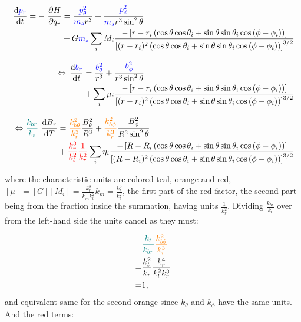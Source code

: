 \begin{align}
    \begin{split}
        \operatorname{}\frac{\mathrm{d} \textcolor{blue}{p_r}}{\mathrm{d} t} = -\operatorname{}\frac{\partial H}{\partial q_r} &= \frac{\textcolor{blue}{p_\theta^2}}{\textcolor{blue}{m_s} r^3} + \frac{\textcolor{blue}{p_\phi^2}}{\textcolor{blue}{m_s} r^3 \sin^2{\theta} } \\
        &+ G \textcolor{blue}{m_s} \sum\limits_{i} M_i \frac{-\left[r - r_i \left(\cos{\theta}\cos{\theta_i} + \sin{\theta}\sin{\theta_i}\cos{(\phi - \phi_i)}\right) \right]}{\left[(r - r_i)^2 \left(\cos{\theta}\cos{\theta_i} + \sin{\theta}\sin{\theta_i}\cos{(\phi - \phi_i)} \right) \right]^{3/2}}
    \end{split} \\[0.3cm]
    \begin{split}
        \Leftrightarrow \operatorname{}\frac{\mathrm{d} \textcolor{blue}{b_r}}{\mathrm{d} t} &= \frac{\textcolor{blue}{b_\theta^2}}{r^3} + \frac{\textcolor{blue}{b_\phi^2}}{r^3 \sin^2{\theta} } \\
        &+ \sum\limits_{i} \mu_i \frac{-\left[r - r_i \left(\cos{\theta}\cos{\theta_i} + \sin{\theta}\sin{\theta_i}\cos{(\phi - \phi_i)}\right) \right]}{\left[(r - r_i)^2 \left(\cos{\theta}\cos{\theta_i} + \sin{\theta}\sin{\theta_i}\cos{(\phi - \phi_i)} \right) \right]^{3/2}}
    \end{split} \\[0.3cm]
    \begin{split}
        \Leftrightarrow \textcolor{teal}{\frac{k_{br}}{k_t}} \operatorname{}\frac{\mathrm{d} B_r}{\mathrm{d} T} &= \textcolor{orange}{\frac{k_{b\theta}^2}{k_r^3}} \frac{B_\theta^2}{R^3} + \textcolor{orange}{\frac{k_{b\phi}^2}{k_r^3}} \frac{B_\phi^2}{R^3 \sin^2{\theta} } \\
        &+ \textcolor{red}{\frac{k_r^3}{k_t^2}\frac{1}{k_r^2}} \sum\limits_{i} \eta_i \frac{-\left[R - R_i \left(\cos{\theta}\cos{\theta_i} + \sin{\theta}\sin{\theta_i}\cos{(\phi - \phi_i)}\right) \right]}{\left[(R - R_i)^2 \left(\cos{\theta}\cos{\theta_i} + \sin{\theta}\sin{\theta_i}\cos{(\phi - \phi_i)} \right) \right]^{3/2}}
    \end{split}
\end{align}

where the characteristic units are colored teal, orange and red, \([\mu] = [G] [M_i] = \frac{k_r^3}{k_m k_t^2} k_m = \frac{k_r^3}{k_t^2} \), the first part of the red factor, the second part being from the fraction inside the summation, having units \(\frac{1}{k_r^2}\). Dividing \(\frac{k_{br}}{k_t}\) over from the left-hand side the units cancel as they must:

\begin{align}
    & \textcolor{teal}{\frac{k_t}{k_{br}}} \textcolor{orange}{\frac{k_{b\theta}^2}{k_r^3} } \\
    = &\frac{k_t^2}{k_r} \frac{k_r^4}{k_t^2 k_r^3}\\
    = &1,
\end{align}
and equivalent same for the second orange since \(k_\theta\) and \(k_\phi\) have the same units. And the red terms:

